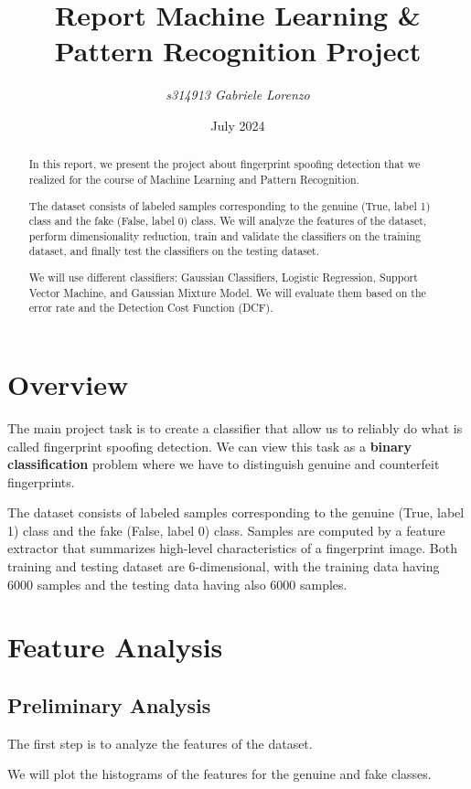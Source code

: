 \documentclass[12pt]{report}
\title{\textbf{Report Machine Learning \& Pattern Recognition Project}}
\author{\textit{s314913 Gabriele Lorenzo}}
\date{July 2024}
\newcommand{\nnl}{%
    \newline
    \newline
}
\newcommand{\nl}{%
    \newline
    \noindent
}
\begin{document}
\maketitle

\begin{abstract}
    In this report, we present the project about fingerprint spoofing detection that we realized for the course of Machine Learning and Pattern Recognition.
    \nl
    The dataset consists of labeled samples corresponding to the genuine (True, label 1) class and the fake (False, label 0) class. We will analyze the features of the dataset, perform dimensionality reduction, train and validate the classifiers on the training dataset, and finally test the classifiers on the testing dataset.
    \nl
    We will use different classifiers: Gaussian Classifiers, Logistic Regression, Support Vector Machine, and Gaussian Mixture Model. We will evaluate them based on the error rate and the Detection Cost Function (DCF).
\end{abstract}

\tableofcontents

\chapter{Overview}
The main project task is to create a classifier that allow us to reliably do what is called fingerprint spoofing detection.
We can view this task as a \textbf{binary classification} problem where we have to distinguish genuine and counterfeit fingerprints.
\nnl
The dataset consists of labeled samples corresponding to the genuine (True, label 1) class and the fake (False, label 0) class.
Samples are computed by a feature extractor that summarizes high-level characteristics of a fingerprint image.
Both training and testing dataset are 6-dimensional, with the training data having 6000 samples and the testing data having also 6000 samples.

\chapter{Feature Analysis}
\section{Preliminary Analysis}
The first step is to analyze the features of the dataset.
\nnl
We will plot the histograms of the features for the genuine and fake classes.
\end{document}
